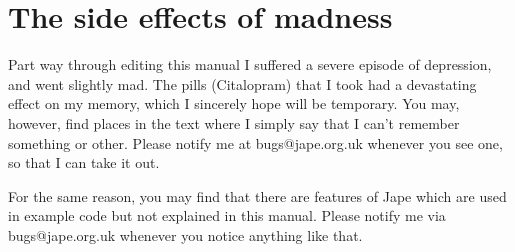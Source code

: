 \section*{The side effects of madness}

Part way through editing this manual I suffered a severe episode of depression, and went slightly mad. The pills (Citalopram) that I took had a devastating effect on my memory, which I sincerely hope will be temporary. You may, however, find places in the text where I simply say that I can't remember something or other. Please notify me at bugs@jape.org.uk whenever you see one, so that I can take it out.

For the same reason, you may find that there are features of Jape which are used in example code but not explained in this manual. Please notify me via bugs@jape.org.uk whenever you notice anything like that.